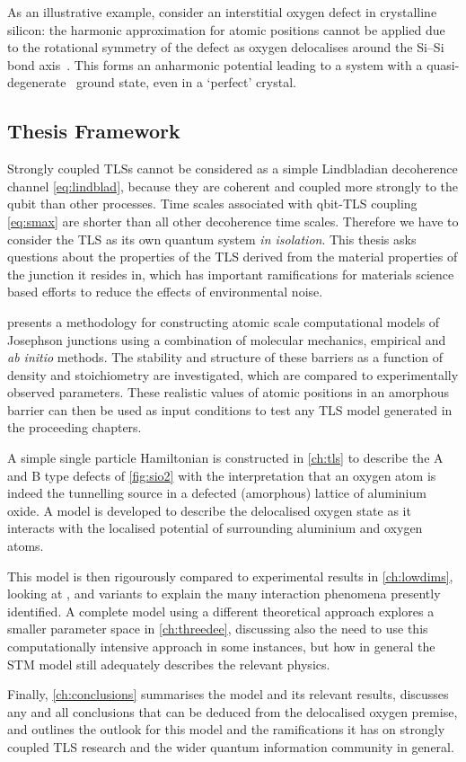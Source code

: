As an illustrative example, consider an interstitial oxygen defect in crystalline silicon: the harmonic approximation for atomic positions cannot be applied due to the rotational symmetry of the defect as oxygen delocalises around the Si--Si bond axis~\cite{Artacho1995}.
This forms an anharmonic potential leading to a system with a quasi-degenerate~\cite{DuBois2013} ground state, even in a `perfect' crystal.


\subsection{Thesis Framework}

Strongly coupled TLSs cannot be considered as a simple Lindbladian decoherence channel \cref{eq:lindblad}, because they are coherent and coupled more strongly to the qubit than other processes.
Time scales associated with qbit-TLS coupling \cref{eq:smax} are shorter than all other decoherence time scales.
Therefore we have to consider the TLS as its own quantum system \textit{in isolation}.
This thesis asks questions about the properties of the TLS derived from the material properties of the junction it resides in, which has important ramifications for materials science based efforts to reduce the effects of environmental noise.

 presents a methodology for constructing atomic scale computational models of Josephson junctions using a combination of molecular mechanics, empirical and \textit{ab initio} methods.
The stability and structure of these barriers as a function of density and stoichiometry are investigated, which are compared to experimentally observed parameters.
These realistic values of atomic positions in an amorphous barrier can then be used as input conditions to test any TLS model generated in the proceeding chapters.

A simple single particle Hamiltonian is constructed in \cref{ch:tls} to describe the A and B type defects of \cref{fig:sio2} with the interpretation that an oxygen atom is indeed the tunnelling source in a defected (amorphous) lattice of aluminium oxide.
A model is developed to describe the delocalised oxygen state as it interacts with the localised potential of surrounding aluminium and oxygen atoms.

This model is then rigourously compared to experimental results in \cref{ch:lowdims}, looking at ,  and  variants to explain the many interaction phenomena presently identified.
A complete  model using a different theoretical approach explores a smaller parameter space in \cref{ch:threedee}, discussing also the need to use this computationally intensive approach in some instances, but how in general the  STM model still adequately describes the relevant physics.

Finally, \cref{ch:conclusions} summarises the model and its relevant results, discusses any and all conclusions that can be deduced from the delocalised oxygen premise, and outlines the outlook for this model and the ramifications it has on strongly coupled TLS research and the wider quantum information community in general.



